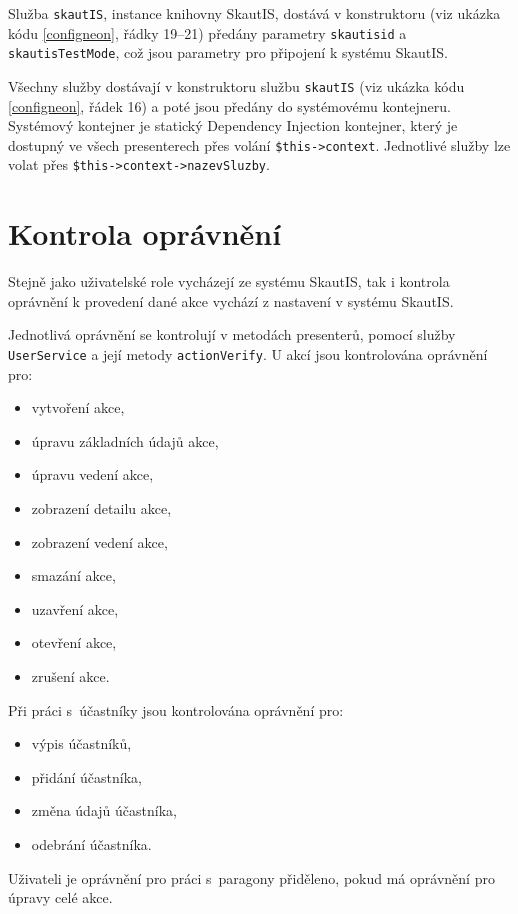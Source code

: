 \documentclass[thesis=B,czech]{FITthesis}[2012/04/27]
\begin{document}
Služba \texttt{skautIS}, instance knihovny SkautIS, dostává v konstruktoru (viz ukázka kódu \ref{configneon}, řádky 19--21) předány parametry \texttt{skautisid} a \texttt{skautisTest\-Mode}, což jsou parametry pro připojení k systému SkautIS. 

Všechny služby dostávají v konstruktoru službu \texttt{skautIS} (viz ukázka kódu \ref{configneon}, řádek 16) a poté jsou předány do systémovému kontejneru. Systémový kontejner je statický Dependency Injection\cite{di} kontejner, který je dostupný ve všech presenterech přes volání \texttt{\$this->context}. Jednotlivé služby lze volat přes \texttt{\$this->context->nazevSluzby}.


\section{Kontrola oprávnění}
Stejně jako uživatelské role vycházejí ze systému SkautIS, tak i kontrola opráv\-nění k provedení dané akce vychází z nastavení v systému SkautIS.

Jednotlivá oprávnění se kontrolují v metodách presenterů, pomocí služby \texttt{UserService} a její metody \texttt{actionVerify}. U akcí jsou kontrolována oprávnění pro:

\begin{itemize}
	\item vytvoření akce,
	\item úpravu základních údajů akce,
	\item úpravu vedení akce,
	\item zobrazení detailu akce,
	\item zobrazení vedení akce,
	\item smazání akce,
	\item uzavření akce,
	\item otevření akce,
	\item zrušení akce.
\end{itemize}

Při práci s~účastníky jsou kontrolována oprávnění pro:
\begin{itemize}
	\item výpis účastníků,
	\item přidání účastníka,
	\item změna údajů účastníka,
	\item odebrání účastníka.
	\end{itemize}

Uživateli je oprávnění pro práci s~paragony přiděleno, pokud má oprávnění pro úpravy celé akce. 	
	
\end{document}
